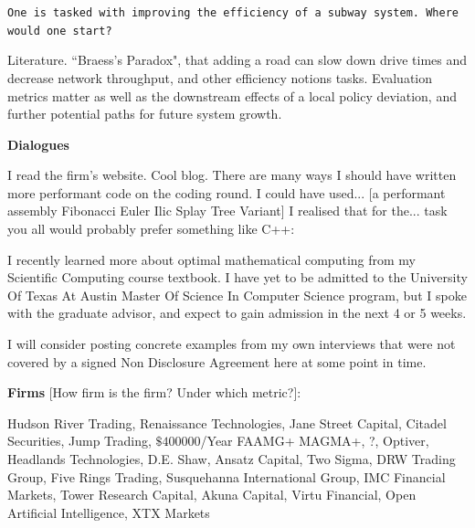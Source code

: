 \texttt{One is tasked with improving the efficiency of a subway system. Where would one start?}

Literature. ``Braess's Paradox", that adding a road can slow down drive times and decrease network throughput, and other efficiency notions tasks. Evaluation metrics matter as well as the downstream effects of a local policy deviation, and further potential paths for future system growth.

\newpage

\textbf{Dialogues}

I read the firm's website. Cool blog. There are many ways I should have written more performant code on the coding round. I could have used... [a performant assembly Fibonacci Euler Ilic Splay Tree Variant] I realised that for the... task you all would probably prefer something like C++:

I recently learned more about optimal mathematical computing from my Scientific Computing course textbook. I have yet to be admitted to the University Of Texas At Austin Master Of Science In Computer Science program, but I spoke with the graduate advisor, and expect to gain admission in the next 4 or 5 weeks.

I will consider posting concrete examples from my own interviews that were not covered by a signed Non Disclosure Agreement here at some point in time.

\newpage

\textbf{Firms} [How firm is the firm? Under which metric?]:

Hudson River Trading, Renaissance Technologies, Jane Street Capital, Citadel Securities, Jump Trading, $\$ 400000$/Year FAAMG+ MAGMA+, ?, Optiver, Headlands Technologies, D.E. Shaw, Ansatz Capital, Two Sigma, DRW Trading Group, Five Rings Trading, Susquehanna International Group, IMC Financial Markets, Tower Research Capital, Akuna Capital, Virtu Financial, Open Artificial Intelligence, XTX Markets

